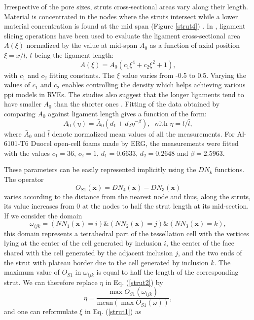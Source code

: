 Irrespective of the pore sizes, struts cross-sectional areas vary along their length. Material is concentrated in the nodes where the struts intersect while a lower material concentration is found at the mid span (Figure \ref{strut4}) \cite{jungMicrostructuralCharacterisationExperimental2017,gongCompressiveResponseOpen2005}. In \cite{jangMicrostructureOpencellFoams2008}, ligament slicing operations have been used to evaluate the ligament cross-sectional area $ A(\xi) $ normalized by the value at mid-span $ A_0 $ as a function of axial position $ \xi=x/l $, $ l $ being the ligament length:
\begin{equation}
A(\xi)=A_0(c_1 \xi^4+c_2\xi^2+1)\label{strut1},
\end{equation}
with $ c_1 $ and $ c_2 $ fitting constants. The $ \xi $ value varies from -0.5 to 0.5. Varying the values of $ c_1 $ and $ c_2 $ enables controlling the density which helps achieving various ppi models in RVEs. The studies also suggest that the longer ligaments tend to have smaller $ A_0 $ than the shorter ones \cite{jangMicrostructureOpencellFoams2008}. Fitting of the data obtained by comparing $ A_0 $ against ligament length gives a function of the form:
\begin{equation}
A_0(\eta)=\bar{A}_0(d_1+d_2\eta^{-\beta}),\,\text{ with } \eta=l/\bar{l}\label{strut2},
\end{equation}
where $ \bar{A}_0 $ and $ \bar{l} $ denote normalized mean values of all the measurements. For Al-6101-T6 Duocel open-cell foams made by ERG, the measurements were fitted with the values $ c_1=36 $, $ c_2=1 $, $ d_1 =0.6633 $, $ d_2=0.2648 $ and $ \beta=2.5963 $.

These parameters can be easily represented implicitly using the $ DN_k $ functions.\label{sec-concavity} The operator 
\begin{equation}
 O_{S1}(\textbf{x})=DN_4(\textbf{x})-DN_3(\textbf{x})  \label{variation1}
\end{equation}
varies according to the distance from the nearest node and thus, along the struts, its value increases from 0 at the nodes to half the strut length at its mid-section. If we consider the domain 
\[ \omega_{ijk}=(NN_1(\textbf{x})=i)\&(NN_2(\textbf{x})=j)\&(NN_3(\textbf{x})=k), \]
this domain represents a tetrahedral part of the tessellation cell with the vertices lying at the center of the cell generated by inclusion $ i $, the center of the face shared with the cell generated by the adjacent inclusion $ j $, and the two ends of the strut with plateau border due to the cell generated by inclusion $ k $.  The maximum value of $ O_{S1} $ in $ \omega_{ijk} $ is equal to half the length of the corresponding strut. We can therefore replace $ \eta $ in Eq. (\ref{strut2}) by 
\begin{equation}
  \eta=\frac{\max O_{S1}(\omega_{ijk})}{\text{mean}(\max O_{S1}(\omega))},
\end{equation} 
and one can reformulate $ \xi $ in Eq. (\ref{strut1}) as

